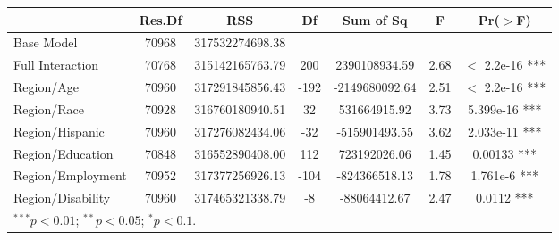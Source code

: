 \documentclass{article}
\begin{document}
	\begin{table}[ht]
		\centering
		\begin{tabular}{lcccccc}
			\hline
			& Res.Df & RSS & Df & Sum of Sq & F & Pr($>$F) \\ 
			\hline
			Base Model & 70968 & 317532274698.38 &  &  &  &  \\ 
			Full Interaction & 70768 & 315142165763.79 & 200 & 2390108934.59 & 2.68 & $<$ 2.2e-16 *** \\ 
			Region/Age & 70960 & 317291845856.43 & -192 & -2149680092.64 & 2.51 & $<$ 2.2e-16 *** \\ 
			Region/Race & 70928 & 316760180940.51 & 32 & 531664915.92 & 3.73 & 5.399e-16 *** \\ 
			Region/Hispanic & 70960 & 317276082434.06 & -32 & -515901493.55 & 3.62 & 2.033e-11 *** \\ 
			Region/Education & 70848 & 316552890408.00 & 112 & 723192026.06 & 1.45 & 0.00133 *** \\ 
			Region/Employment & 70952 & 317377256926.13 & -104 & -824366518.13 & 1.78 & 1.761e-6 *** \\ 
			Region/Disability & 70960 & 317465321338.79 & -8 & -88064412.67 & 2.47 & 0.0112 *** \\ 
			\hline
			\multicolumn{7}{l}{\scriptsize{$^{***}p<0.01$; $^{**}p<0.05$; $^{*}p<0.1$.}}
		\end{tabular}
	\end{table}
\end{document}
